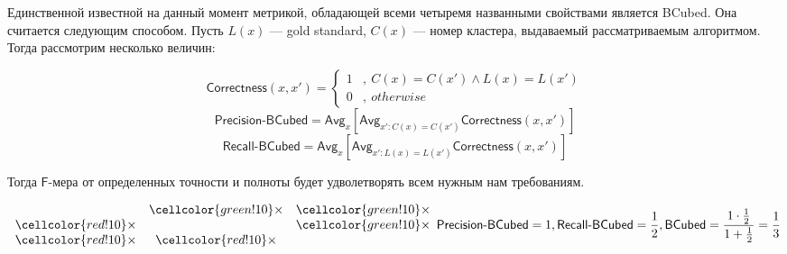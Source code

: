 \documentclass[12pt,fleqn]{article}
\newcommand\xo{\times}
\begin{document}
Единственной известной на данный момент метрикой, обладающей всеми четыремя названными свойствами является BCubed. Она считается следующим способом. Пусть $L(x)$ --- gold standard, $C(x)$ --- номер кластера, выдаваемый рассматриваемым алгоритмом. Тогда рассмотрим несколько величин:

\[
\mathsf{Correctness}(x, x') = 
\begin{cases} 
1 &,\ C(x) = C(x') \wedge L(x) = L(x') \\ 
0 &,\ otherwise
\end{cases}
\]
\[
\mathsf{Precision\mbox{-}BCubed} = \mathsf{Avg}_x \left[\mathsf{Avg}_{x':C(x)=C(x')}\mathsf{Correctness}(x, x')\right]
\]
\[
\mathsf{Recall\mbox{-}BCubed} = \mathsf{Avg}_x \left[\mathsf{Avg}_{x':L(x)=L(x')}\mathsf{Correctness}(x, x')\right]
\]

Тогда $\mathsf F$-мера от определенных точности и полноты будет удволетворять всем нужным нам требованиям.

\begin{vkExample}
\[
\begin{array}{ccc}
     &  \cellcolor{green!10} \xo &  \cellcolor{green!10}\xo \\
    \cellcolor{red!10} \xo  &   &  \cellcolor{green!10} \xo \\
    \cellcolor{red!10} \xo  & \cellcolor{red!10} \xo  & \\
\end{array} \\
\mathsf{Precision\mbox{-}BCubed} = 1, \\
\mathsf{Recall\mbox{-}BCubed} = \frac12, \\
\mathsf{BCubed} = \frac{1 \cdot \frac{1}{2}}{1 + \frac{1}{2}} = \frac{1}{3}
\]
\end{vkExample}
\end{document}

